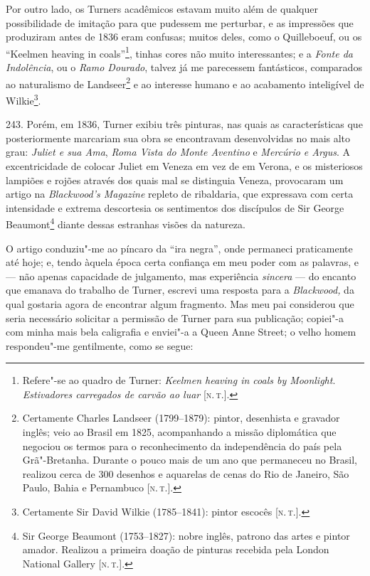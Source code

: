 Por outro lado, os Turners acadêmicos estavam muito além de qualquer
possibilidade de imitação para que pudessem me perturbar, e as
impressões que produziram antes de 1836 eram confusas; muitos deles,
como o Quilleboeuf, ou os ``Keelmen heaving in coals''\footnote{Refere"-se
  ao quadro de Turner: \emph{Keelmen heaving in coals by Moonlight}.
  \emph{Estivadores carregados de carvão ao luar} {[}\textsc{n.\,t.}{]}.},
tinhas cores não muito interessantes; e a \emph{Fonte da Indolência}, ou
o \emph{Ramo Dourado}, talvez já me parecessem fantásticos, comparados
ao naturalismo de Landseer\footnote{Certamente Charles Landseer
  (1799--1879): pintor, desenhista e gravador inglês; veio ao Brasil em
  1825, acompanhando a missão diplomática que negociou os termos para o
  reconhecimento da independência do país pela Grã"-Bretanha. Durante o
  pouco mais de um ano que permaneceu no Brasil, realizou cerca de 300
  desenhos e aquarelas de cenas do Rio de Janeiro, São Paulo, Bahia e
  Pernambuco {[}\textsc{n.\,t.}{]}.} e ao interesse humano e ao acabamento
inteligível de Wilkie\footnote{Certamente Sir David Wilkie (1785--1841):
  pintor escocês {[}\textsc{n.\,t.}{]}.}.

243. Porém, em 1836, Turner exibiu três pinturas, nas quais as
características que posteriormente marcariam sua obra se encontravam
desenvolvidas no mais alto grau: \emph{Juliet e sua Ama}, \emph{Roma
Vista do Monte Aventino} e \emph{Mercúrio e Argus}. A excentricidade de
colocar Juliet em Veneza em vez de em Verona, e os misteriosos lampiões
e rojões através dos quais mal se distinguia Veneza, provocaram um
artigo na \emph{Blackwood's Magazine} repleto de ribaldaria, que
expressava com certa intensidade e extrema descortesia os sentimentos
dos discípulos de Sir George Beaumont\footnote{Sir George Beaumont
  (1753--1827): nobre inglês, patrono das artes e pintor amador. Realizou
  a primeira doação de pinturas recebida pela London National Gallery
  {[}\textsc{n.\,t.}{]}.} diante dessas estranhas visões da natureza.

O artigo conduziu"-me ao píncaro da ``ira negra'', onde permaneci
praticamente até hoje; e, tendo àquela época certa confiança em meu
poder com as palavras, e --- não apenas capacidade de julgamento, mas
experiência \emph{sincera} --- do encanto que emanava do trabalho de
Turner, escrevi uma resposta para a \emph{Blackwood,} da qual gostaria
agora de encontrar algum fragmento. Mas meu pai considerou que seria
necessário solicitar a permissão de Turner para sua publicação; copiei"-a
com minha mais bela caligrafia e enviei"-a a Queen Anne Street; o velho
homem respondeu"-me gentilmente, como se segue: %


